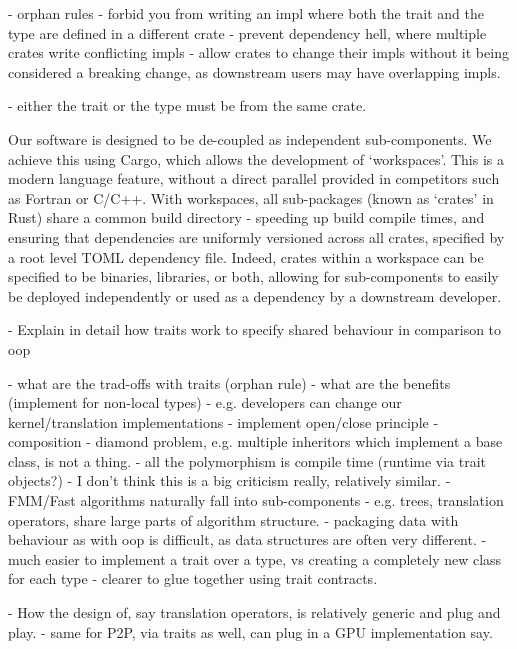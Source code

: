     - orphan rules
        - forbid you from writing an impl where both the trait and the type are defined in a different crate
            - prevent dependency hell, where multiple crates write conflicting impls
        - allow crates to change their impls without it being considered a breaking change, as downstream users may have overlapping impls.

    - either the trait or the type must be from the same crate.




Our software is designed to be de-coupled as independent sub-components. We achieve this using Cargo, which allows the development of `workspaces'. This is a modern language feature, without a direct parallel provided in competitors such as Fortran or C/C++. With workspaces, all sub-packages (known as `crates' in Rust) share a common build directory - speeding up build compile times, and ensuring that dependencies are uniformly versioned across all crates, specified by a root level TOML dependency file. Indeed, crates within a workspace can be specified to be binaries, libraries, or both, allowing for sub-components to easily be deployed independently or used as a dependency by a downstream developer.

- Explain in detail how traits work to specify shared behaviour in comparison to oop

- what are the trad-offs with traits (orphan rule)
- what are the benefits (implement for non-local types)
    - e.g. developers can change our kernel/translation implementations
    - implement open/close principle - composition
    - diamond problem, e.g. multiple inheritors which implement a base class, is not a thing.
    - all the polymorphism is compile time (runtime via trait objects?)
        - I don't think this is a big criticism really, relatively similar.
    - FMM/Fast algorithms naturally fall into sub-components
        - e.g. trees, translation operators, share large parts of algorithm structure.
        - packaging data with behaviour as with oop is difficult, as data structures are often very different.
            - much easier to implement a trait over a type, vs creating a completely new class for each type
                - clearer to glue together using trait contracts.



- How the design of, say translation operators, is relatively generic and plug and play.
- same for P2P, via traits as well, can plug in a GPU implementation say.
